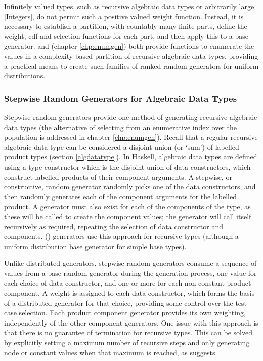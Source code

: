 Infinitely valued types,
such as recursive algebraic data types or arbitrarily large |Integers|,
do not permit such a positive valued weight function.
Instead,
it is necessary to establish a partition,
with countably many finite parts,
define the weight, cdf and selection functions for each part,
and then apply this to a base generator.
\FEAT and \GC (chapter \ref{chp:enumgen}) both provide
functions to enumerate the values in a complexity based partition
of recursive algebraic data types,
providing a practical means to create such families of ranked random generators
for uniform distributions.

\subsubsection{Stepwise Random Generators for Algebraic Data Types }
Stepwise random generators provide one method of 
generating recursive algebraic data types
(the alternative of selecting from an enumerative index over the population is addressed in chapter \ref{chp:enumgen}).
Recall that a regular recursive algebraic data type
can be considered a disjoint union (or `sum') of labelled product types (section \ref{algdatatype}).
In Haskell, algebraic data types are defined using 
a type constructor which is the disjoint union of data constructors,
which construct labelled products of their component arguments.
A stepwise, or constructive, random generator 
randomly picks one of the data constructors,
and then randomly generates each of the component arguments
for the labelled product.
A generator must also exist for each of 
the components of the type,
as these will be called to create the component values;
the generator will call itself recursively as required,
repeating the selection of data constructor and components.
\QC (\cite{Claessen2003}) generators use this approach for recursive types
(although a uniform distribution base generator for simple base types).

Unlike distributed generators,
stepwise random generators consume a sequence of values
from a base random generator during the generation process,
one value for each choice of data constructor,
and one or more for each non-constant product component.
A weight is assigned to each data constructor,
which forms the basis of a distributed generator for that choice,
providing some control over the test case selection.
Each product component generator provides its own weighting,
independently of the other component generators.
One issue with this approach is that there is no guarantee of termination for recursive types.
This can be solved by explicitly setting a maximum number of recursive steps
and only generating node or constant values when that maximum is reached,
as \cite{Claessen2003} suggests.

